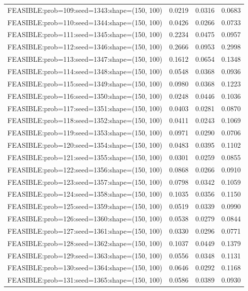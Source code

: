\begin{longtable}{lccc}
FEASIBLE:prob=109:seed=1343:shape=(150, 100) & 0.0219 & 0.0316 & 0.0683 \\
FEASIBLE:prob=110:seed=1344:shape=(150, 100) & 0.0426 & 0.0266 & 0.0733 \\
FEASIBLE:prob=111:seed=1345:shape=(150, 100) & 0.2234 & 0.0475 & 0.0957 \\
FEASIBLE:prob=112:seed=1346:shape=(150, 100) & 0.2666 & 0.0953 & 0.2998 \\
FEASIBLE:prob=113:seed=1347:shape=(150, 100) & 0.1612 & 0.0654 & 0.1348 \\
FEASIBLE:prob=114:seed=1348:shape=(150, 100) & 0.0548 & 0.0368 & 0.0936 \\
FEASIBLE:prob=115:seed=1349:shape=(150, 100) & 0.0980 & 0.0368 & 0.1223 \\
FEASIBLE:prob=116:seed=1350:shape=(150, 100) & 0.0248 & 0.0446 & 0.1036 \\
FEASIBLE:prob=117:seed=1351:shape=(150, 100) & 0.0403 & 0.0281 & 0.0870 \\
FEASIBLE:prob=118:seed=1352:shape=(150, 100) & 0.0411 & 0.0243 & 0.1069 \\
FEASIBLE:prob=119:seed=1353:shape=(150, 100) & 0.0971 & 0.0290 & 0.0706 \\
FEASIBLE:prob=120:seed=1354:shape=(150, 100) & 0.0483 & 0.0395 & 0.1102 \\
FEASIBLE:prob=121:seed=1355:shape=(150, 100) & 0.0301 & 0.0259 & 0.0855 \\
FEASIBLE:prob=122:seed=1356:shape=(150, 100) & 0.0868 & 0.0266 & 0.0910 \\
FEASIBLE:prob=123:seed=1357:shape=(150, 100) & 0.0798 & 0.0342 & 0.1059 \\
FEASIBLE:prob=124:seed=1358:shape=(150, 100) & 0.1035 & 0.0356 & 0.1150 \\
FEASIBLE:prob=125:seed=1359:shape=(150, 100) & 0.0519 & 0.0339 & 0.0990 \\
FEASIBLE:prob=126:seed=1360:shape=(150, 100) & 0.0538 & 0.0279 & 0.0844 \\
FEASIBLE:prob=127:seed=1361:shape=(150, 100) & 0.0330 & 0.0296 & 0.0771 \\
FEASIBLE:prob=128:seed=1362:shape=(150, 100) & 0.1037 & 0.0449 & 0.1379 \\
FEASIBLE:prob=129:seed=1363:shape=(150, 100) & 0.0556 & 0.0348 & 0.1131 \\
FEASIBLE:prob=130:seed=1364:shape=(150, 100) & 0.0646 & 0.0292 & 0.1168 \\
FEASIBLE:prob=131:seed=1365:shape=(150, 100) & 0.0586 & 0.0389 & 0.0930 \\

\end{longtable}
